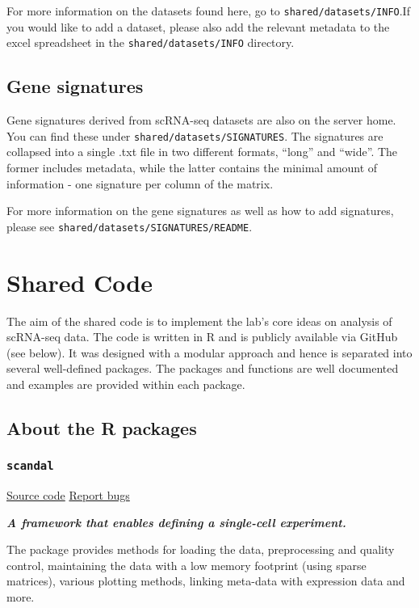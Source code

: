\documentclass[]{book}
\begin{document}
For more information on the datasets found here, go to
\texttt{shared/datasets/INFO}.If you would like to add a dataset, please
also add the relevant metadata to the excel spreadsheet in the
\texttt{shared/datasets/INFO} directory.

\section{Gene signatures}\label{gene-signatures}

Gene signatures derived from scRNA-seq datasets are also on the server
home. You can find these under \texttt{shared/datasets/SIGNATURES}. The
signatures are collapsed into a single .txt file in two different
formats, ``long'' and ``wide''. The former includes metadata, while the
latter contains the minimal amount of information - one signature per
column of the matrix.

For more information on the gene signatures as well as how to add
signatures, please see \texttt{shared/datasets/SIGNATURES/README}.

\chapter{Shared Code}\label{sharedCode}

The aim of the shared code is to implement the lab's core ideas on
analysis of scRNA-seq data. The code is written in R and is publicly
available via GitHub (see below). It was designed with a modular
approach and hence is separated into several well-defined packages. The
packages and functions are well documented and examples are provided
within each package.

\section{About the R packages}\label{about-the-r-packages}

\subsection{\texorpdfstring{\texttt{scandal}}{scandal}}\label{scandal}

\href{https://github.com/dravishays/scandal}{Source code} \textbar{}
\href{https://github.com/dravishays/scandal/issues}{Report bugs}

\emph{\textbf{A framework that enables defining a single-cell
experiment.}}

The package provides methods for loading the data, preprocessing and
quality control, maintaining the data with a low memory footprint (using
sparse matrices), various plotting methods, linking meta-data with
expression data and more.
\end{document}
